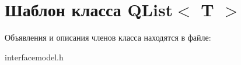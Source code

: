\hypertarget{class_q_list}{}\section{Шаблон класса Q\+List$<$ T $>$}
\label{class_q_list}


Объявления и описания членов класса находятся в файле\+:\begin{DoxyCompactItemize}
\item 
interfacemodel.\+h\end{DoxyCompactItemize}
